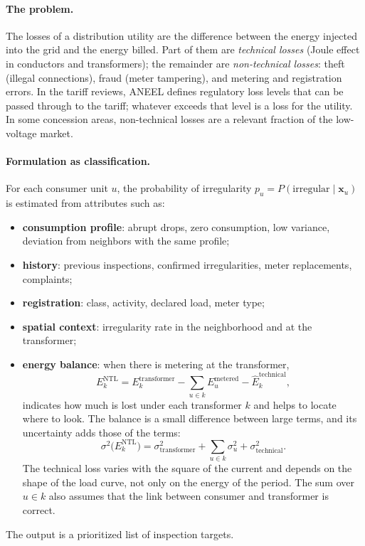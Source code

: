 \documentclass[10pt,a4paper,oneside]{article}
\begin{document}
\paragraph{The problem.} The losses of a distribution utility are the
difference between the energy injected into the grid and the energy billed.
Part of them are \emph{technical losses} (Joule effect in conductors and
transformers); the remainder are \emph{non-technical losses}: theft (illegal
connections), fraud (meter tampering), and metering and registration errors.
In the tariff reviews, ANEEL defines regulatory loss levels that can be
passed through to the tariff; whatever exceeds that level is a loss for the
utility. In some concession areas, non-technical losses are a relevant
fraction of the low-voltage market.

\paragraph{Formulation as classification.} For each consumer unit $u$, the
probability of irregularity
$p_u = P(\text{irregular} \mid \mathbf{x}_u)$ is estimated from attributes
such as:
\begin{itemize}
  \item \textbf{consumption profile}: abrupt drops, zero consumption, low
    variance, deviation from neighbors with the same profile;
  \item \textbf{history}: previous inspections, confirmed irregularities,
    meter replacements, complaints;
  \item \textbf{registration}: class, activity, declared load, meter type;
  \item \textbf{spatial context}: irregularity rate in the neighborhood and
    at the transformer;
  \item \textbf{energy balance}: when there is metering at the transformer,
    \begin{equation}
      E^{\text{NTL}}_{k} = E^{\text{transformer}}_{k} - \sum_{u \in k} E^{\text{metered}}_{u}
      - \hat{E}^{\text{technical}}_{k},
    \end{equation}
    indicates how much is lost under each transformer $k$ and helps to
    locate where to look. The balance is a small difference between large
    terms, and its uncertainty adds those of the terms:
    \begin{equation}
      \sigma^2\big(E^{\text{NTL}}_{k}\big) = \sigma^2_{\text{transformer}}
      + \sum_{u \in k} \sigma^2_{u} + \sigma^2_{\text{technical}}.
    \end{equation}
    The technical loss varies with the square of the current and depends on
    the shape of the load curve, not only on the energy of the period. The
    sum over $u \in k$ also assumes that the link between consumer and
    transformer is correct.
\end{itemize}
The output is a prioritized list of inspection targets.
\end{document}
